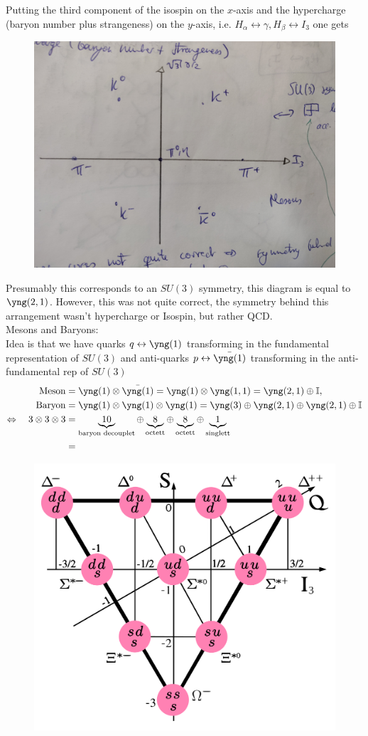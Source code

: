 Putting the third component of the isospin on the $x$-axis and the hypercharge (baryon number plus strangeness) on the $y$-axis, i.e. $H_\alpha \leftrightarrow \gamma,H_\beta \leftrightarrow I_3$ one gets
\begin{figure}[h!]
	\centering
	\includegraphics[width=0.7\linewidth]{gfx/eightfoldway}
	\caption{}
	\label{fig:eightfoldway}
\end{figure}
Presumably this corresponds to an $SU(3)$ symmetry, this diagram is equal to $\yng(2,1)$. However, this was not quite correct, the symmetry behind this arrangement wasn't hypercharge or Isospin, but rather QCD.\\
Mesons and Baryons:\\
Idea is that we have quarks $q \leftrightarrow \yng(1)$ transforming in the fundamental representation of $SU(3)$ and anti-quarks $p \leftrightarrow \bar{ \yng(1)}$ transforming in the anti-fundamental rep of $SU(3)$
\begin{align*}
	\text{Meson} &= \yng(1) \otimes \bar{ \yng(1)} = \yng(1) \otimes \yng(1,1) = \yng(2,1) \oplus \mI,\\
	\text{Baryon} &= \yng(1) \otimes \yng(1) \otimes \yng(1) = \yng(3) \oplus \yng(2,1) \oplus \yng(2,1) \oplus \mI \\
	\Leftrightarrow \quad 3\otimes 3\otimes 3&= \underbrace{10}_{\text{baryon decouplet}} \oplus \underbrace{8}_{\text{octett}} \oplus \underbrace{8}_{\text{octett}} \oplus \underbrace{1}_{\text{singlett}}\\
	&=
\end{align*}
\begin{figure}[h!]
	\centering
	\includegraphics[width=0.5\linewidth]{gfx/Baryon-decuplet}
	\caption{}
	\label{fig:baryon-decuplet}
\end{figure}
